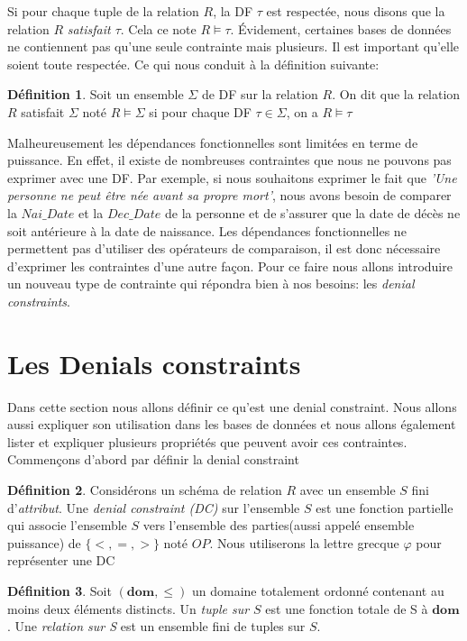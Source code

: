 \documentclass[letterpaper, 12pt]{report}
\theoremstyle{definition}
\newtheorem{mydef}{Définition}
\newcommand{\dom}{\mathbf{dom}}
\begin{document}
Si pour chaque tuple de la relation $R$, la DF $\tau$ est respectée, nous disons que la relation $R$ \emph{satisfait $\tau$}. Cela ce note $R \models \tau$. Évidement, certaines bases de données ne contiennent pas qu'une seule contrainte mais plusieurs. Il est important qu'elle soient toute respectée. Ce qui nous conduit à la définition suivante:
  
\begin{mydef}
Soit un ensemble $\Sigma$ de DF sur la relation $R$. On dit que la relation $R$ satisfait $\Sigma$ noté $R \models \Sigma$ si pour chaque DF $ \tau \in \Sigma$, on a $R \models \tau$
\end{mydef}

Malheureusement les dépendances fonctionnelles sont limitées en terme de puissance. En effet, il existe de nombreuses contraintes que nous ne pouvons pas exprimer avec une DF. Par exemple, si nous souhaitons exprimer le fait que \emph{'Une personne ne peut être née avant sa propre mort'}, nous avons besoin de comparer la $Nai\_Date$ et la $Dec\_Date$ de la personne et de s'assurer que la date de décès ne soit antérieure à la date de naissance. Les dépendances fonctionnelles ne permettent pas d'utiliser des opérateurs de comparaison, il est donc nécessaire d'exprimer les contraintes d'une autre façon. Pour ce faire nous allons introduire un nouveau type de contrainte qui répondra bien à nos besoins: les \emph{denial constraints}.

\section{Les Denials constraints}

Dans cette section nous allons définir ce qu'est une denial constraint. Nous allons aussi expliquer son utilisation dans les bases de données et nous allons également lister et expliquer plusieurs propriétés que peuvent avoir ces contraintes. Commençons d'abord par définir la denial constraint

\begin{mydef}
Considérons un schéma de relation $R$ avec un ensemble $S$ fini d'\emph{attribut}. Une \emph{denial constraint (DC)} sur l'ensemble $S$ est une fonction partielle qui associe l'ensemble $S$ vers l'ensemble des parties(aussi appelé ensemble puissance) de $\{ <,=,> \}$ noté $OP$. Nous utiliserons la lettre grecque $\varphi$ pour représenter une DC
\end{mydef}

\begin{mydef}
 Soit $(\dom,\leq)$ un domaine totalement ordonné contenant au moins deux éléments distincts. Un \emph{tuple sur $S$} est une fonction totale de S à $\dom$. Une \emph{relation sur S} est un ensemble fini de tuples sur $S$. 
\end{mydef}
\end{document}
